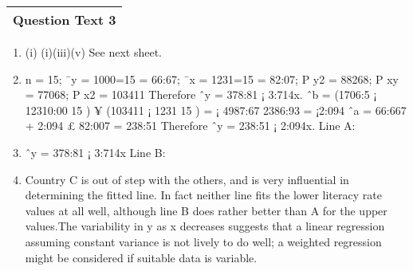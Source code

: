 \documentclass[a4paper,12pt]{article}
\begin{document}
\begin{table}[ht!]
 \centering
 \begin{tabular}{|p{15cm}|}
 \hline  
Question Text 3 
\\ \hline
  \end{tabular}
\end{table}\begin{enumerate}
\item (i) (i)(iii)(v) See next sheet.
\item n = 15; ¯y = 1000=15 = 66:67; ¯x = 1231=15 = 82:07;
P
y2 = 88268;
P
xy =
77068;
P
x2 = 103411 Therefore ˆy = 378:81 ¡ 3:714x.
ˆb
= (1706:5 ¡
12310:00
15
) ¥ (103411 ¡
1231
15
) = ¡
4987:67
2386:93
= ¡2:094
ˆa = 66:667 + 2:094 £ 82:007 = 238:51 Therefore ˆy = 238:51 ¡ 2:094x. Line A:
\item ˆy = 378:81 ¡ 3:714x Line B:
\item Country C is out of step with the others, and is very influential in determining the fitted
line. In fact neither line fits the lower literacy rate values at all well, although line B does
rather better than A for the upper values.The variability in y as x decreases suggests
that a linear regression assuming constant variance is not lively to do well; a weighted
regression might be considered if suitable data is variable.
\end{enumerate}
\end{document}

